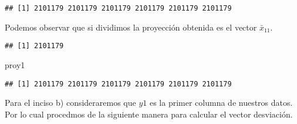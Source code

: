 \documentclass[]{article}
\newenvironment{Shaded}{\begin{snugshade}}{\end{snugshade}}
\newcommand{\CommentTok}[1]{\textcolor[rgb]{0.56,0.35,0.01}{\textit{#1}}}
\newcommand{\ControlFlowTok}[1]{\textcolor[rgb]{0.13,0.29,0.53}{\textbf{#1}}}
\newcommand{\DecValTok}[1]{\textcolor[rgb]{0.00,0.00,0.81}{#1}}
\newcommand{\FloatTok}[1]{\textcolor[rgb]{0.00,0.00,0.81}{#1}}
\newcommand{\KeywordTok}[1]{\textcolor[rgb]{0.13,0.29,0.53}{\textbf{#1}}}
\newcommand{\NormalTok}[1]{#1}
\newcommand{\OperatorTok}[1]{\textcolor[rgb]{0.81,0.36,0.00}{\textbf{#1}}}
\newcommand{\StringTok}[1]{\textcolor[rgb]{0.31,0.60,0.02}{#1}}
\begin{document}
\begin{Shaded}
\end{Shaded}

\begin{verbatim}
## [1] 2101179 2101179 2101179 2101179 2101179 2101179
\end{verbatim}

Podemos observar que si dividimos la proyección obtenida es el vector
\(\bar{x}_11\).

\begin{Shaded}
\end{Shaded}

\begin{verbatim}
## [1] 2101179
\end{verbatim}

\begin{Shaded}
\begin{Highlighting}[]
\NormalTok{proy1}
\end{Highlighting}
\end{Shaded}

\begin{verbatim}
## [1] 2101179 2101179 2101179 2101179 2101179 2101179
\end{verbatim}

Para el inciso b) consideraremos que \(y1\) es la primer columna de
nuestros datos. Por lo cual procedmos de la siguiente manera para
calcular el vector desviación.

\begin{Shaded}
\end{Shaded}
\end{document}
